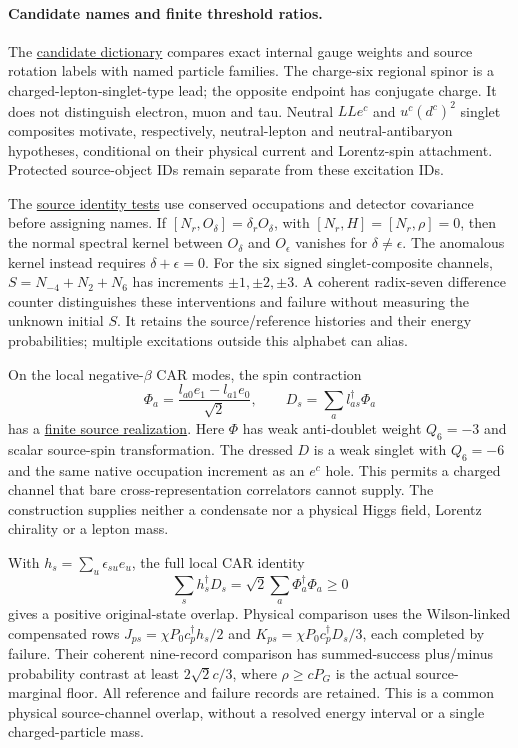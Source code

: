 \paragraph{Candidate names and finite threshold ratios.}
The \href{https://github.com/FloatingPragma/observer-patch-holography/blob/main/model/standard_model_source_map/candidates/PROOF.md}{candidate dictionary}
compares exact internal gauge weights and source rotation labels with
named particle families. The charge-six regional spinor is a
charged-lepton-singlet-type lead; the opposite endpoint has conjugate
charge. It does not distinguish electron, muon and tau. Neutral
$LL e^c$ and $u^c(d^c)^2$ singlet composites motivate, respectively,
neutral-lepton and neutral-antibaryon hypotheses, conditional on their
physical current and Lorentz-spin attachment. Protected source-object
IDs remain separate from these excitation IDs.

The \href{https://github.com/FloatingPragma/observer-patch-holography/blob/main/model/particle_candidate_confirmation/PROOF.md}{source identity tests}
use conserved occupations and detector covariance before assigning names.
If $[N_r,O_\delta]=\delta_rO_\delta$, with $[N_r,H]=[N_r,\rho]=0$,
then the normal spectral kernel between $O_\delta$ and $O_\epsilon$
vanishes for $\delta\ne\epsilon$. The anomalous kernel instead requires
$\delta+\epsilon=0$. For the six signed singlet-composite channels,
$S=N_{-4}+N_2+N_6$ has increments $\pm1,\pm2,\pm3$.
A coherent radix-seven difference counter distinguishes these
interventions and failure without measuring the unknown initial $S$.
It retains the source/reference histories and their energy probabilities;
multiple excitations outside this alphabet can alias.

On the local negative-$\beta$ CAR modes, the spin contraction
\[
 \Phi_a=\frac{l_{a0}e_1-l_{a1}e_0}{\sqrt2},\qquad
 D_s=\sum_a l_{as}^{\dagger}\Phi_a
\]
has a \href{https://github.com/FloatingPragma/observer-patch-holography/blob/main/model/particle_candidate_charged/PROOF.md}{finite source realization}.
Here $\Phi$ has weak anti-doublet weight $Q_6=-3$ and scalar source-spin
transformation. The dressed $D$ is a weak singlet with $Q_6=-6$ and the
same native occupation increment as an $e^c$ hole. This permits a charged
channel that bare cross-representation correlators cannot supply. The
construction supplies neither a condensate nor a physical Higgs field,
Lorentz chirality or a lepton mass.

With $h_s=\sum_u\epsilon_{su}e_u$, the full local CAR identity
\[
 \sum_s h_s^\dagger D_s=\sqrt2\sum_a\Phi_a^\dagger\Phi_a\ge0
\]
gives a positive original-state overlap. Physical comparison uses the
Wilson-linked compensated rows $J_{ps}=\chi P_0c_p^\dagger h_s/2$ and
$K_{ps}=\chi P_0c_p^\dagger D_s/3$, each completed by failure.
Their coherent nine-record comparison has summed-success plus/minus
probability contrast at least $2\sqrt2c/3$, where $\rho\ge cP_G$ is
the actual source-marginal floor. All reference and failure records are
retained. This is a common physical source-channel overlap, without a
resolved energy interval or a single charged-particle mass.

